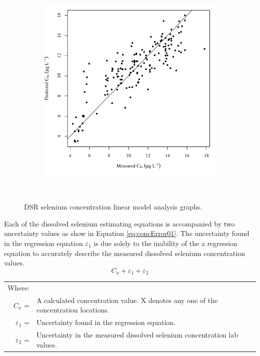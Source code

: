 \begin{linenumbers}
\subfiguremid
\begin{landscape}
	\begin{figure}
		\begin{subfigure}{0.7\textwidth}
			\centering
			\includegraphics[width=\tableCustomSize]{"Figures/Results_DSR/Stochastic/Conc Model pred v meas DDIV"}
		\end{subfigure}\\
		\caption{DSR selenium concentration linear model analysis graphs.}
	\end{figure}
\end{landscape}
\subfiguretop

Each of the dissolved selenium estimating equations is accompanied by two uncertainty values as show in Equation \ref{eq:concError01}.  The uncertainty found in the regression equation $ \varepsilon_1 $ is due solely to the inability of the a regression equation to accurately describe the measured dissolved selenium concentration values.  
\begin{equation}
\label{eq:concError01}
C_x + \varepsilon_1 + \varepsilon_2
\end{equation}
\begin{tabular}{r p{5.5in}}
	Where: \\
	$ C_x $ = & A calculated concentration value.  X denotes any one of the concentration locations.\\
	$ \varepsilon_1 $ = & Uncertainty found in the regression equation.\\
	$ \varepsilon_2 $ = & Uncertainty in the measured dissolved selenium concentration lab values.\\
\end{tabular}\\


\end{linenumbers}
